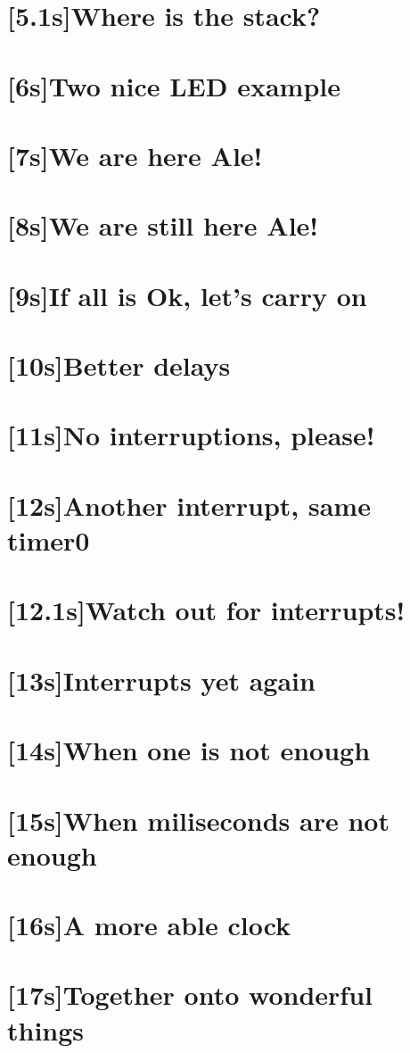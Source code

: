 \documentclass[12pt, a4paper]{book}
\begin{document}
\section{[5.1s]Where is the stack?}
\section{[6s]Two nice LED example}
\section{[7s]We are here Ale!}
\section{[8s]We are still here Ale!}
\section{[9s]If all is Ok, let's carry on}
\section{[10s]Better delays}
\section{[11s]No interruptions, please!}
\section{[12s]Another interrupt, same timer0}
\section{[12.1s]Watch out for interrupts!}
\section{[13s]Interrupts yet again}
\section{[14s]When one is not enough}
\section{[15s]When miliseconds are not enough}
\section{[16s]A more able clock}
\section{[17s]Together onto wonderful things}
\end{document}
